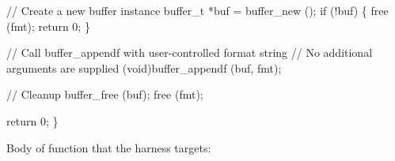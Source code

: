 \documentclass[
  a4paper,
]{scrreprt}
\newenvironment{Shaded}{\begin{snugshade}}{\end{snugshade}}
\newcommand{\CommentTok}[1]{\textcolor[rgb]{0.41,0.41,0.41}{#1}}
\newcommand{\ControlFlowTok}[1]{\textcolor[rgb]{0.85,0.12,0.09}{#1}}
\newcommand{\DataTypeTok}[1]{\textcolor[rgb]{0.47,0.16,0.63}{#1}}
\newcommand{\DecValTok}[1]{\textcolor[rgb]{0.47,0.16,0.63}{#1}}
\newcommand{\NormalTok}[1]{\textcolor[rgb]{0.33,0.33,0.33}{#1}}
\newcommand{\OperatorTok}[1]{\textcolor[rgb]{0.00,0.46,0.62}{#1}}
\theoremstyle{definition}
\theoremstyle{remark}
\begin{document}
\begin{Shaded}
\begin{Highlighting}[numbers=left,,]
  \CommentTok{// Create a new buffer instance}
\NormalTok{  buffer\_t }\OperatorTok{*}\NormalTok{buf }\OperatorTok{=}\NormalTok{ buffer\_new }\OperatorTok{();}
  \ControlFlowTok{if} \OperatorTok{(!}\NormalTok{buf}\OperatorTok{)}
    \OperatorTok{\{}
\NormalTok{      free }\OperatorTok{(}\NormalTok{fmt}\OperatorTok{);}
      \ControlFlowTok{return} \DecValTok{0}\OperatorTok{;}
    \OperatorTok{\}}

  \CommentTok{// Call buffer\_appendf with user{-}controlled format string}
  \CommentTok{// No additional arguments are supplied}
  \OperatorTok{(}\DataTypeTok{void}\OperatorTok{)}\NormalTok{buffer\_appendf }\OperatorTok{(}\NormalTok{buf}\OperatorTok{,}\NormalTok{ fmt}\OperatorTok{);}

  \CommentTok{// Cleanup}
\NormalTok{  buffer\_free }\OperatorTok{(}\NormalTok{buf}\OperatorTok{);}
\NormalTok{  free }\OperatorTok{(}\NormalTok{fmt}\OperatorTok{);}

  \ControlFlowTok{return} \DecValTok{0}\OperatorTok{;}
\OperatorTok{\}}
\end{Highlighting}
\end{Shaded}

Body of function that the harness targets:
\end{document}
